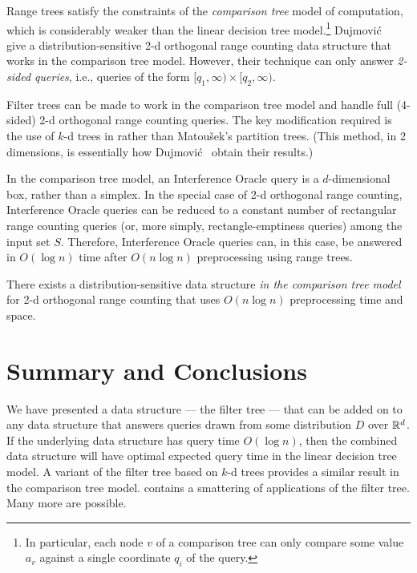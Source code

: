 \documentclass{patmorin}
\begin{document}
Range trees satisfy the constraints of the \emph{comparison tree} model of
computation, which is considerably weaker than the linear decision tree
model.\footnote{In particular, each node $v$ of a comparison tree can
only compare some value $a_v$ against a single coordinate $q_i$ of the
query.} Dujmovi\'c \etal\ \cite{dhm09} give a distribution-sensitive 2-d
orthogonal range counting data structure that works in the comparison
tree model.  However, their technique can only answer \emph{2-sided
queries}, i.e., queries of the form $[q_1,\infty)\times[q_2,\infty)$.

Filter trees can be made to work in the comparison tree model
and handle full (4-sided) 2-d orthogonal range counting queries.
The key modification required is the use of $k$-d trees in
 rather than Matou\v{s}ek's partition
trees. (This method, in 2 dimensions, is essentially how Dujmovi\'c \etal\
obtain their results.)

In the comparison tree model, an Interference Oracle query is a
$d$-dimensional box, rather than a simplex. In the special case of
2-d orthogonal range counting, Interference Oracle queries can be
reduced to a constant number of rectangular range counting queries
(or, more simply, rectangle-emptiness queries) among the input set $S$.
Therefore, Interference Oracle queries can, in this case, be answered in
$O(\log n)$ time after $O(n\log n)$ preprocessing using range trees.

\begin{thm}
  There exists a distribution-sensitive data structure \emph{in the
  comparison tree model} for 2-d orthogonal range counting that uses
  $O(n\log n)$ preprocessing time and space.
\end{thm}

\section{Summary and Conclusions}

We have presented a data structure --- the filter tree --- that can
be added on to any data structure that answers queries drawn from some
distribution $D$ over $\mathbb{R}^d$.  If the underlying data structure has query
time $O(\log n)$, then the combined data structure will have optimal
expected query time in the linear decision tree model.  A variant of
the filter tree based on $k$-d trees provides a similar result in the
comparison tree model.  \secref{applications} contains a smattering of
applications of the filter tree.  Many more are possible.
\end{document}
